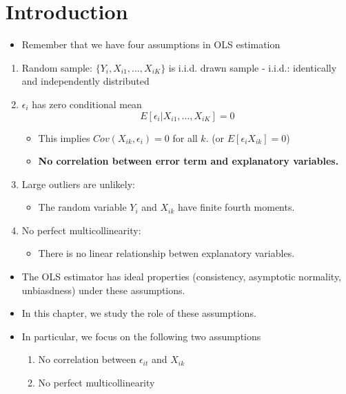 \documentclass[]{book}
\providecommand{\tightlist}{%
  \setlength{\itemsep}{0pt}\setlength{\parskip}{0pt}}
\begin{document}
\section{Introduction}\label{introduction-1}

\begin{itemize}
\tightlist
\item
  Remember that we have four assumptions in OLS estimation
\end{itemize}

\begin{enumerate}
\def\labelenumi{\arabic{enumi}.}
\tightlist
\item
  Random sample: \(\{ Y_i , X_{i1}, \ldots, X_{iK} \}\) is i.i.d. drawn
  sample - i.i.d.: identically and independently distributed
\item
  \(\epsilon_i\) has zero conditional mean \[
    E[ \epsilon_i | X_{i1}, \ldots, X_{iK}] = 0
    \]

  \begin{itemize}
  \tightlist
  \item
    This implies \(Cov(X_{ik}, \epsilon_i) = 0\) for all \(k\). (or
    \(E[\epsilon_i X_{ik}] = 0\))
  \item
    \textbf{No correlation between error term and explanatory
    variables.}
  \end{itemize}
\item
  Large outliers are unlikely:

  \begin{itemize}
  \tightlist
  \item
    The random variable \(Y_i\) and \(X_{ik}\) have finite fourth
    moments.
  \end{itemize}
\item
  No perfect multicollinearity:

  \begin{itemize}
  \tightlist
  \item
    There is no linear relationship betwen explanatory variables.
  \end{itemize}
\end{enumerate}

\begin{itemize}
\tightlist
\item
  The OLS estimator has ideal properties (consistency, asymptotic
  normality, unbiasdness) under these assumptions.
\item
  In this chapter, we study the role of these assumptions.
\item
  In particular, we focus on the following two assumptions

  \begin{enumerate}
  \def\labelenumi{\arabic{enumi}.}
  \tightlist
  \item
    No correlation between \(\epsilon_{it}\) and \(X_{ik}\)
  \item
    No perfect multicollinearity
  \end{enumerate}
\end{itemize}
\end{document}
